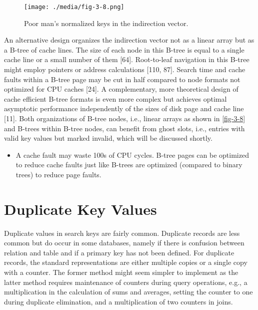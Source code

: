 \begin{figure}
  \centering
  \texttt{[image: ./media/fig-3-8.png]}

  \caption{Poor man's normalized keys in the indirection vector.\label{fig-3-8}}
\end{figure}

An alternative design organizes the indirection vector not as a linear
array but as a B-tree of cache lines. The size of each node in this
B-tree is equal to a single cache line or a small number of them
{[}64{]}. Root-to-leaf navigation in this B-tree might employ pointers
or address calculations {[}110, 87{]}. Search time and cache faults
within a B-tree page may be cut in half compared to node formats not
optimized for CPU caches {[}24{]}. A complementary, more theoretical
design of cache efficient B-tree formats is even more complex but
achieves optimal asymptotic performance independently of the sizes of
disk page and cache line {[}11{]}. Both organizations of B-tree nodes,
i.e., linear arrays as shown in \autoref{fig-3-8} and B-trees within B-tree
nodes, can benefit from ghost slots, i.e., entries with valid key values
but marked invalid, which will be discussed shortly.

\begin{itemize}
  \item
A cache fault may waste 100s of CPU cycles. B-tree pages can be
optimized to reduce cache faults just like B-trees are optimized
(compared to binary trees) to reduce page faults.
\end{itemize}

\hypertarget{duplicate-key-values}{%
\section{Duplicate Key Values}\label{duplicate-key-values}}

Duplicate values in search keys are fairly common. Duplicate records are
less common but do occur in some databases, namely if there is confusion
between relation and table and if a primary key has not been defined.
For duplicate records, the standard representations are either multiple
copies or a single copy with a counter. The former method might seem
simpler to implement as the latter method requires maintenance of
counters during query operations, e.g., a multiplication in the
calculation of sums and averages, setting the counter to one during
duplicate elimination, and a multiplication of two counters in joins.


